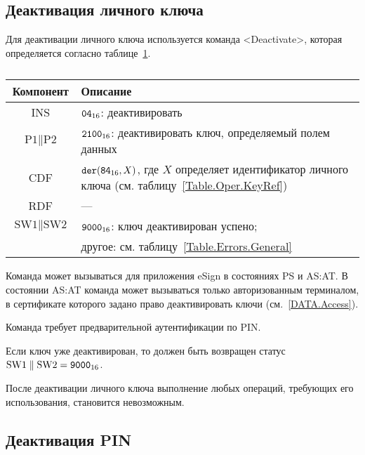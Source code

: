\subsection{Деактивация личного ключа}
\label{Oper.Descr.DeactivateKey} 

Для деактивации личного ключа 
используется команда <Deactivate>,
которая определяется согласно 
таблице~\ref{Table.Oper.DeactivateKeyCmd}.

\begin{table}[hbt]
\caption{}\label{Table.Oper.DeactivateKeyCmd}
\begin{tabular}{|c|p{14cm}|}
\hline
Компонент & Описание\\
\hline
\hline
INS & $\texttt{04}_{16}$: деактивировать\\
\hline
$\text{P1} \parallel \text{P2}$ & $\texttt{2100}_{16}$: 
деактивировать ключ, определяемый полем данных\\
\hline
CDF &  $\texttt{der}(\texttt{84}_{16}, X)$,   
где $X$ определяет идентификатор личного ключа 
(см. таблицу~\ref{Table.Oper.KeyRef})\\
\hline 
RDF & --- \\
\hline
$\text{SW1} \parallel \text{SW2}$ & 
$\texttt{9000}_{16}$: ключ деактивирован успено; \\
  & другое: см. таблицу~\ref{Table.Errors.General} \\
\hline
\end{tabular}
\end{table}

Команда может вызываться для приложения eSign в состояниях 
PS и AS:AT. В состоянии AS:AT команда может вызываться 
только авторизованным терминалом, в сертификате которого задано право
деактивировать ключи (см.~\ref{DATA.Access}).

Команда требует предварительной аутентификации по PIN. 

Если ключ уже деактивирован, то должен быть возвращен статус
$\text{SW1} \parallel \text{SW2} = \texttt{9000}_{16}$.

После деактивации личного ключа выполнение любых операций, 
требующих его использования, становится невозможным.

\subsection{Деактивация PIN}
\label{Oper.Descr.DeactivatePIN} 

